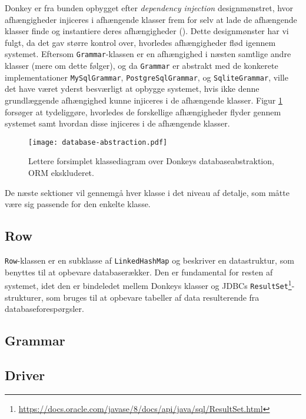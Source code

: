 Donkey er fra bunden opbygget efter \textit{dependency injection} designmønstret, hvor afhængigheder injiceres i afhængende klasser frem for selv at lade de afhængende klasser finde og instantiere deres afhængigheder (\cite{wiki:di}). Dette designmønster har vi fulgt, da det gav større kontrol over, hvorledes afhængigheder flød igennem systemet. Eftersom \texttt{Grammar}-klassen er en afhængighed i næsten samtlige andre klasser (mere om dette følger), og da \texttt{Grammar} er abstrakt med de konkerete implementationer \texttt{MySqlGrammar}, \texttt{PostgreSqlGrammar}, og \texttt{SqliteGrammar}, ville det have været yderst besværligt at opbygge systemet, hvis ikke denne grundlæggende afhængighed kunne injiceres i de afhængende klasser. Figur \ref{class-diagram:database-abstraction} forsøger at tydeliggøre, hvorledes de forskellige afhængigheder flyder gennem systemet samt hvordan disse injiceres i de afhængende klasser.

\begin{figure}[h]
  \centeringg
  \texttt{[image: database-abstraction.pdf]}
  \caption{Lettere forsimplet klassediagram over Donkeys databaseabstraktion, ORM ekskluderet.}
  \label{class-diagram:database-abstraction}
\end{figure}

De næste sektioner vil gennemgå hver klasse i det niveau af detalje, som måtte være sig passende for den enkelte klasse.

\subsection{Row}

\texttt{Row}-klassen er en subklasse af \texttt{LinkedHashMap} og beskriver en datastruktur, som benyttes til at opbevare databaserækker. Den er fundamental for resten af systemet, idet den er bindeledet mellem Donkeys klasser og JDBCs \texttt{ResultSet}\footnote{\url{https://docs.oracle.com/javase/8/docs/api/java/sql/ResultSet.html}}-strukturer, som bruges til at opbevare tabeller af data resulterende fra databaseforespørgsler.

\subsection{Grammar}

\subsection{Driver}

